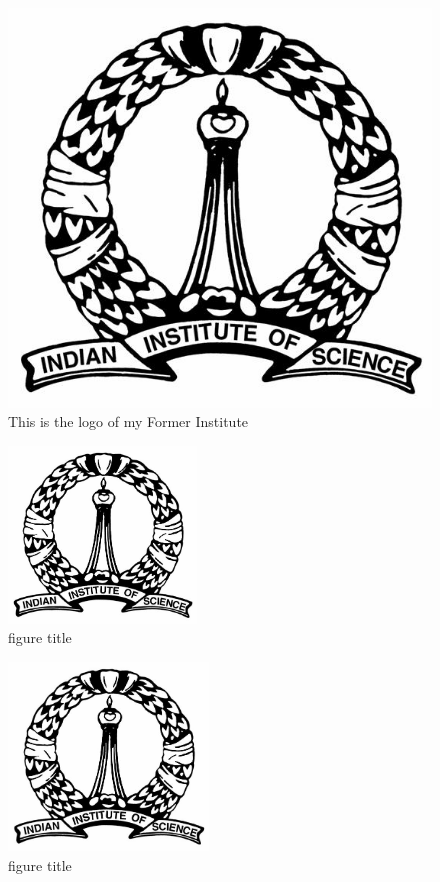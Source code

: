 \documentclass[10pt,a4paper]{article}
\begin{document}
\begin{figure}
    \centering
    \includegraphics[scale=1.0]{IISc_logo.jpg}
    \caption{This is the logo of my Former Institute} 
    \label{reference}
\end{figure}

\begin{figure}
    \centering
    \includegraphics[width=5cm]{IISc_logo.jpg}
    \caption{figure title}
    \label{reference1}
\end{figure}

\begin{figure}
    \centering
    \includegraphics[height=5cm]{IISc_logo.jpg}
    \caption{figure title}
    \label{reference2}
\end{figure}
\end{document}
